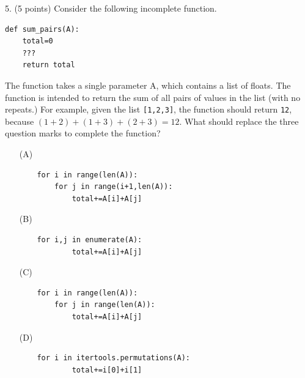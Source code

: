 \documentclass{article}
\newcounter{question}
\begin{document}
\noindent
\begin{minipage}{\textwidth}
5. (5 points)
Consider the following incomplete function.
\begin{verbatim}
def sum_pairs(A):
    total=0
    ???
    return total
\end{verbatim}
The function takes a single parameter A, which contains a list of floats. The function is intended to return the sum of all pairs of values in the list (with no repeats.) For example, given the list \verb|[1,2,3]|, the function should return \verb|12|, because $(1+2)+(1+3)+(2+3)=12$. What should replace the three question marks to complete the function?

\begin{enumerate}
\item[(A)]
\begin{verbatim}
    for i in range(len(A)):
        for j in range(i+1,len(A)):
            total+=A[i]+A[j]
\end{verbatim}

\item[(B)]
\begin{verbatim}
    for i,j in enumerate(A):
            total+=A[i]+A[j]
\end{verbatim}

\item[(C)]
\begin{verbatim}
    for i in range(len(A)):
        for j in range(len(A)):
            total+=A[i]+A[j]
\end{verbatim}

\item[(D)]
\begin{verbatim}
    for i in itertools.permutations(A):
            total+=i[0]+i[1]
\end{verbatim}

\end{enumerate}
\end{minipage}
\vspace{10em}
\filbreak\vfil{}\vfilneg
\end{document}
